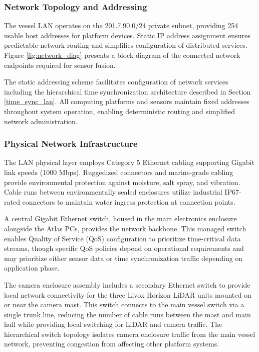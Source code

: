 \documentclass{erauthesis}
\begin{document}
\subsubsection{Network Topology and Addressing}

The vessel LAN operates on the 201.7.90.0/24 private subnet, providing 254 usable host addresses for platform devices. Static IP address assignment ensures predictable network routing and simplifies configuration of distributed services. 
Figure \ref{fig:network_diag} presents a block diagram of the connected network endpoints required for sensor fusion.

The static addressing scheme facilitates configuration of network services including the hierarchical time synchronization architecture described in Section \ref{time_sync_lan}. All computing platforms and sensors maintain fixed addresses throughout system operation, enabling deterministic routing and simplified network administration.

\subsubsection{Physical Network Infrastructure}

The LAN physical layer employs Category 5 Ethernet cabling supporting Gigabit link speeds (1000 Mbps). Ruggedized connectors and marine-grade cabling provide environmental protection against moisture, salt spray, and vibration. Cable runs between environmentally sealed enclosures utilize industrial IP67-rated connectors to maintain water ingress protection at connection points.

A central Gigabit Ethernet switch, housed in the main electronics enclosure alongside the Atlas PCs, provides the network backbone. This managed switch enables Quality of Service (QoS) configuration to prioritize time-critical data streams, though specific QoS policies depend on operational requirements and may prioritize either sensor data or time synchronization traffic depending on application phase.

The camera enclosure assembly includes a secondary Ethernet switch to provide local network connectivity for the three Livox Horizon LiDAR units mounted on or near the camera mast. This switch connects to the main vessel switch via a single trunk line, reducing the number of cable runs between the mast and main hull while providing local switching for LiDAR and camera traffic. The hierarchical switch topology isolates camera enclosure traffic from the main vessel network, preventing congestion from affecting other platform systems.
\end{document}

